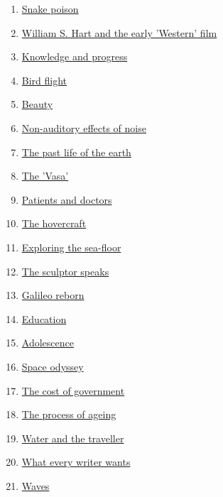 \documentclass[11pt]{article}
\begin{document}
\begin{multicols}{2}
\begin{enumerate}
		\item \href{https://mp.weixin.qq.com/s/IEeHzp2qjMWw8rQ5uPzcJA}{Snake poison}	%
		\item \href{https://mp.weixin.qq.com/s/tx3bHuWyYmJKmkmxhFYUnQ}{William S. Hart and the early 'Western' film}	%
		\item \href{https://mp.weixin.qq.com/s/h3_AwCL8nz5D_v0GseSBoQ}{Knowledge and progress}	%
		\item \href{https://mp.weixin.qq.com/s/7E6CCuNaWFEJSdNKfJVZ1g}{Bird flight}	%
		\item \href{https://mp.weixin.qq.com/s/EW-S52ED5ri74tcAdztwaQ}{Beauty}	%
		\item \href{https://mp.weixin.qq.com/s/71Ufi4ohM6-dyLyMsUFOWQ}{Non-auditory effects of noise}	%
		\item \href{https://mp.weixin.qq.com/s/eXCkVlV6x5XZWn1x_snlgA}{The past life of the earth}	%
		\item \href{https://mp.weixin.qq.com/s/5oSp89S3EdSm5SybR3UVfQ}{The 'Vasa'}	%
		\item \href{https://mp.weixin.qq.com/s/Amu_78Z7_izN6EnL420f5w}{Patients and doctors}	%
		\item \href{https://mp.weixin.qq.com/s/VfEThM5Qit4ze81WI3nXlw}{The hovercraft}	%
		\item \href{https://mp.weixin.qq.com/s/xXIPcjlmbCPB28Chbyku7Q}{Exploring the sea-floor}	%
		\item \href{https://mp.weixin.qq.com/s/TpR2f4KSITWODLCPsLhmjQ}{The sculptor speaks}	%
		\item \href{https://mp.weixin.qq.com/s/u6VuVNlwuz3VIUuc9rGVgw}{Galileo reborn}	%
		\item \href{https://mp.weixin.qq.com/s/Q_CBeldPZUYVVVxwRMUDLQ}{Education}	%
		\item \href{https://mp.weixin.qq.com/s/2_Gkmdx7EdRhh0svgwNaTg}{Adolescence}	%
		\item \href{https://mp.weixin.qq.com/s/PauFEdgAOAWJZpxMjjETzA}{Space odyssey}	%
		\item \href{https://mp.weixin.qq.com/s/Ix_DjEoFzscfKp3ym5g77g}{The cost of government}	%
		\item \href{https://mp.weixin.qq.com/s/Q52X8aMCJoEryxjUpFxmXg}{The process of ageing}	%
		\item \href{https://mp.weixin.qq.com/s/ys-ZQP2rDxAVfSEQQaIH9g}{Water and the traveller}	%
		\item \href{https://mp.weixin.qq.com/s/VEPuppD4fzGrh6zmWdnwDg}{What every writer wants}	%
		\item \href{https://mp.weixin.qq.com/s/i_jFWHDNm8qUBJmNwvdraA}{Waves}	%

\end{enumerate}
\end{multicols}
\end{document}
